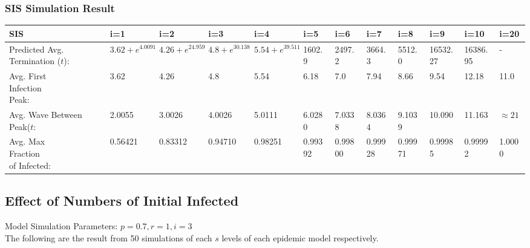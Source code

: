 \documentclass{subfile}
\begin{document}
  \subsubsection{SIS Simulation Result}
  \begin{adjustbox}{max width=1.2\textwidth,center}
    \begin{tabular}{|l|l|l|l|l|l|l|l|l|l|l|l|}
      \hline
      SIS & i=1 & i=2 & i=3 & i=4 & i=5 & i=6 & i=7 & i=8 & i=9 & i=10 & i=20\\
      \hline
      \makecell{Predicted\\Avg.\\Termination\\(\(t\))}\footnotemark: & \(3.62 + e^{4.0091}\) & \(4.26 + e^{24.959}\) & \(4.8 + e^{30.138}\) & \(5.54 + e^{39.511}\) & 1602.9 & 2497.2 & 3664.3 & 5512.0 & 16532.27 & 16386.95 & -\footnotemark\\
      \hline
      \makecell{Avg. First\\Infection\\Peak:} & 3.62& 4.26& 4.8& 5.54& 6.18& 7.0& 7.94& 8.66& 9.54& 12.18 & 11.0\footnotemark\\
      \hline
      \makecell{Avg. Wave\\Between Peak(\(t\):} & 2.0055 & 3.0026 & 4.0026 & 5.0111 & 6.0280 & 7.0338 & 8.0364 & 9.1039 & 10.090 & 11.163 & \(\approx21\)\footnotemark\\
      \hline
      \makecell{Avg. Max\\Fraction\\of Infected:} & 0.56421& 0.83312& 0.94710& 0.98251& 0.99392& 0.99800&
 0.99928& 0.99971&  0.99985& 0.99992& 1.0000\\
      \hline
    \end{tabular}
  \end{adjustbox}

  \subsection{Effect of Numbers of Initial Infected}
  Model Simulation Parameters: \(p=0.7, r=1, i=3\)\\
  The following are the result from 50 simulations of each \(s\) levels of each epidemic model respectively.
\end{document}
